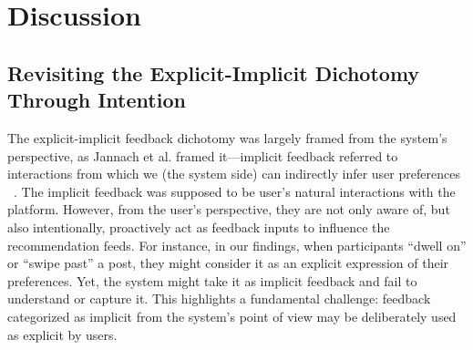 \section{Discussion}
\subsection{Revisiting the Explicit-Implicit Dichotomy Through Intention}

The explicit-implicit feedback dichotomy was largely framed from the system's perspective, as Jannach et al. framed it---implicit feedback referred to interactions from which we (the system side) can indirectly infer user preferences ~\cite{jannach2018recommending}. The implicit feedback was supposed to be user's natural interactions with the platform. However, from the user’s perspective, they are not only aware of, but also intentionally, proactively act as feedback inputs to influence the recommendation feeds. For instance, in our findings, when participants ``dwell on'' or ``swipe past'' a post, they might consider it as an explicit expression of their preferences. Yet, the system might take it as implicit feedback and fail to understand or capture it. This highlights a fundamental challenge: feedback categorized as implicit from the system's point of view may be deliberately used as explicit by users.

